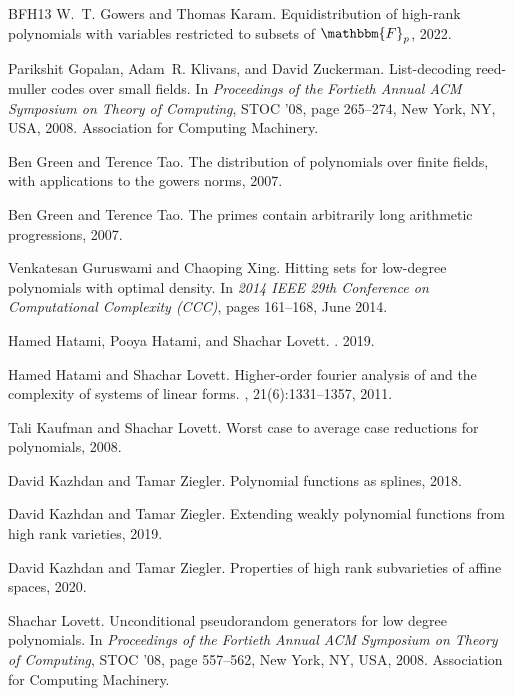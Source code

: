 \documentclass[10pt,a4paper]{article}
\begin{document}
\begin{thebibliography}{BFH{\etalchar{+}}13}
W.~T. Gowers and Thomas Karam.
\newblock Equidistribution of high-rank polynomials with variables restricted
  to subsets of $\mathbbm{F}_p$, 2022.

Parikshit Gopalan, Adam~R. Klivans, and David Zuckerman.
\newblock List-decoding reed-muller codes over small fields.
\newblock In {\em Proceedings of the Fortieth Annual ACM Symposium on Theory of
  Computing}, STOC '08, page 265–274, New York, NY, USA, 2008. Association
  for Computing Machinery.

Ben Green and Terence Tao.
\newblock The distribution of polynomials over finite fields, with applications
  to the gowers norms, 2007.

Ben Green and Terence Tao.
\newblock The primes contain arbitrarily long arithmetic progressions, 2007.

Venkatesan Guruswami and Chaoping Xing.
\newblock Hitting sets for low-degree polynomials with optimal density.
\newblock In {\em 2014 IEEE 29th Conference on Computational Complexity (CCC)},
  pages 161--168, June 2014.

Hamed Hatami, Pooya Hatami, and Shachar Lovett.
.
 2019.

Hamed Hatami and Shachar Lovett.
\newblock Higher-order fourier analysis of and the complexity of systems of
  linear forms.
, 21(6):1331--1357, 2011.

Tali Kaufman and Shachar Lovett.
\newblock Worst case to average case reductions for polynomials, 2008.

David Kazhdan and Tamar Ziegler.
\newblock Polynomial functions as splines, 2018.

David Kazhdan and Tamar Ziegler.
\newblock Extending weakly polynomial functions from high rank varieties, 2019.

David Kazhdan and Tamar Ziegler.
\newblock Properties of high rank subvarieties of affine spaces, 2020.

Shachar Lovett.
\newblock Unconditional pseudorandom generators for low degree polynomials.
\newblock In {\em Proceedings of the Fortieth Annual ACM Symposium on Theory of
  Computing}, STOC '08, page 557–562, New York, NY, USA, 2008. Association
  for Computing Machinery.


\end{thebibliography}
\end{document}
